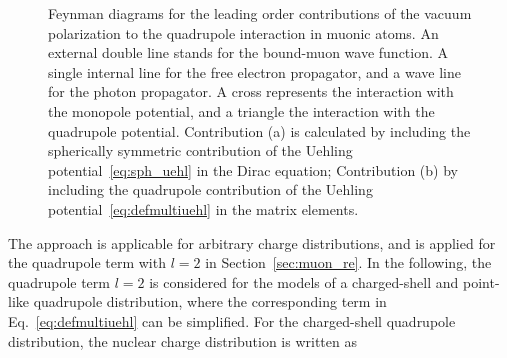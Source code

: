 %
\begin{figure}[t]%
\centering
{}
\hspace{2cm}
\caption{
Feynman diagrams for the leading order contributions of the vacuum polarization to the quadrupole interaction in muonic atoms. An external double line stands for the bound-muon wave function. A single internal line for the free electron propagator, and a wave line for the photon propagator. A cross represents the interaction with the monopole potential, and a triangle the interaction with the quadrupole potential. Contribution (a) is calculated by including the spherically symmetric contribution of the Uehling potential~\eqref{eq:sph_uehl} in the Dirac equation; Contribution (b) by including the quadrupole contribution of the Uehling potential~\eqref{eq:defmultiuehl} in the matrix elements.
}
\label{fig:quehl}
\end{figure}
%
The approach is applicable for arbitrary charge distributions, and is applied for the quadrupole term with $l=2$ in Section~\ref{sec:muon_re}. In the following, the quadrupole term $l=2$ is considered for the models of a charged-shell and point-like quadrupole distribution, where the corresponding term in Eq.~\eqref{eq:defmultiuehl} can be simplified. For the charged-shell quadrupole distribution, the nuclear charge distribution is written as
